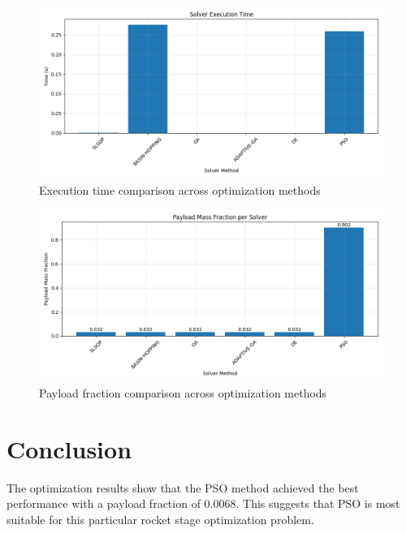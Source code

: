 \documentclass{article}
\begin{document}
\begin{figure}[H]
\centering
\includegraphics[width=\textwidth]{execution_time.png}
\caption{Execution time comparison across optimization methods}
\label{fig:execution-time}
\end{figure}

\begin{figure}[H]
\centering
\includegraphics[width=\textwidth]{payload_fraction.png}
\caption{Payload fraction comparison across optimization methods}
\label{fig:payload-fraction}
\end{figure}

\section{Conclusion}
The optimization results show that the PSO method achieved the best performance with a payload fraction of 0.0068. This suggests that PSO is most suitable for this particular rocket stage optimization problem.
\end{document}
